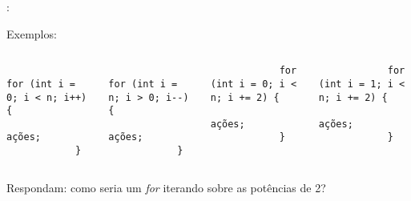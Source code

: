 \begin{frame}[fragile]{\insertsection: \insertsubsection}

	Exemplos:
	\begin{columns}
		\begin{verbatim}
			for (int i = 0; i < n; i++) {
				ações;
			}
		\end{verbatim}
		\begin{verbatim}
			for (int i = n; i > 0; i--) {
				ações;
			}
		\end{verbatim}

		\begin{verbatim}
			for (int i = 0; i < n; i += 2) {
				ações;
			}
		\end{verbatim}
		\begin{verbatim}
			for (int i = 1; i < n; i += 2) {
				ações;
			}
		\end{verbatim}
	\end{columns}

	Respondam: como seria um \textit{for} iterando sobre as potências de 2?

\end{frame}
